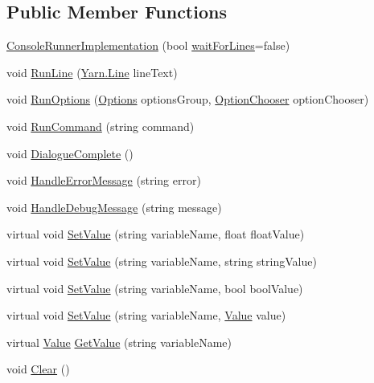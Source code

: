 \subsection*{Public Member Functions}
\begin{DoxyCompactItemize}
\item 
\hyperlink{a00055_a8a2687bbff3f09203c14fa505b06f505}{Console\-Runner\-Implementation} (bool \hyperlink{a00055_a90b0c755ea1d2f3ffaffa6cf18266709}{wait\-For\-Lines}=false)
\item 
void \hyperlink{a00055_a13bc6c3a8ba43223a20befae50dbbcb4}{Run\-Line} (\hyperlink{a00050_a00352}{Yarn.\-Line} line\-Text)
\item 
void \hyperlink{a00055_a62674694fa65e5ae8c0c0da4fbceda51}{Run\-Options} (\hyperlink{a00050_a00355}{Options} options\-Group, \hyperlink{a00050_a39866cbb03c03a35805d598b5d4ad553}{Option\-Chooser} option\-Chooser)
\item 
void \hyperlink{a00055_aef048f9dbd90258eacc2886aa48ef6af}{Run\-Command} (string command)
\item 
void \hyperlink{a00055_ad6299fd476e53164d9f97d324d8c5936}{Dialogue\-Complete} ()
\item 
void \hyperlink{a00055_a925ecf432875c3831adc1a9959db8b46}{Handle\-Error\-Message} (string error)
\item 
void \hyperlink{a00055_ab656ffe1f6e66f2e6d2cb3e970f54b90}{Handle\-Debug\-Message} (string message)
\item 
virtual void \hyperlink{a00055_afbf35444dc4e3dcef57746803ad432db}{Set\-Value} (string variable\-Name, float float\-Value)
\item 
virtual void \hyperlink{a00055_ab9e0c7e52efd43d767c79085806195ec}{Set\-Value} (string variable\-Name, string string\-Value)
\item 
virtual void \hyperlink{a00055_abeda3f7eb2611b48abfed778c6c37e6e}{Set\-Value} (string variable\-Name, bool bool\-Value)
\item 
virtual void \hyperlink{a00055_ab6312d89b626ca803a74a9181286d608}{Set\-Value} (string variable\-Name, \hyperlink{a00167}{Value} value)
\item 
virtual \hyperlink{a00167}{Value} \hyperlink{a00055_a66fc86080cd452079f5adf15e97c8e41}{Get\-Value} (string variable\-Name)
\item 
void \hyperlink{a00055_a082617cf099d13cb4338935020ced764}{Clear} ()
\end{DoxyCompactItemize}
